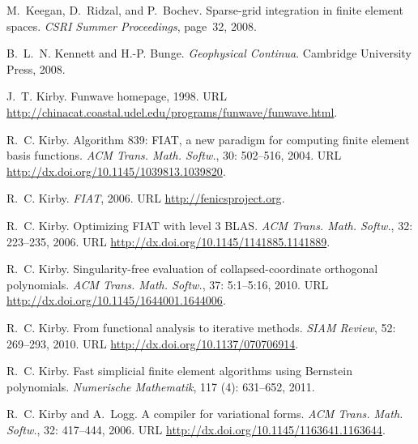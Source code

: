 \begin{thebibliography}{467}
M.~Keegan, D.~Ridzal, and P.~Bochev.
\newblock Sparse-grid integration in finite element spaces.
\newblock \emph{CSRI Summer Proceedings}, page~32, 2008.

B.~L.~N. Kennett and H.-P. Bunge.
\newblock \emph{Geophysical Continua}.
\newblock Cambridge University Press, 2008.

J.~T. Kirby.
\newblock Funwave homepage, 1998.
\newblock URL
  \url{http://chinacat.coastal.udel.edu/programs/funwave/funwave.html}.

R.~C. Kirby.
\newblock Algorithm 839: {FIAT}, a new paradigm for computing finite element
  basis functions.
\newblock \emph{ACM Trans. Math. Softw.}, 30: 502--516, 2004.
\newblock URL \url{http://dx.doi.org/10.1145/1039813.1039820}.

R.~C. Kirby.
\newblock \emph{{FIAT}}, 2006{}.
\newblock URL \url{http://fenicsproject.org}.

R.~C. Kirby.
\newblock Optimizing {FIAT} with level 3 {BLAS}.
\newblock \emph{ACM Trans. Math. Softw.}, 32: 223--235,
  2006{}.
\newblock URL \url{http://dx.doi.org/10.1145/1141885.1141889}.

R.~C. Kirby.
\newblock Singularity-free evaluation of collapsed-coordinate orthogonal
  polynomials.
\newblock \emph{ACM Trans. Math. Softw.}, 37: 5:1--5:16,
  2010{}.
\newblock URL \url{http://dx.doi.org/10.1145/1644001.1644006}.

R.~C. Kirby.
\newblock From functional analysis to iterative methods.
\newblock \emph{SIAM Review}, 52: 269--293, 2010{}.
\newblock URL \url{http://dx.doi.org/10.1137/070706914}.

R.~C. Kirby.
\newblock Fast simplicial finite element algorithms using {B}ernstein
  polynomials.
\newblock \emph{Numerische Mathematik}, 117 (4): 631--652,
  2011.

R.~C. Kirby and A.~Logg.
\newblock A compiler for variational forms.
\newblock \emph{ACM Trans. Math. Softw.}, 32: 417--444, 2006.
\newblock URL \url{http://dx.doi.org/10.1145/1163641.1163644}.


\end{thebibliography}
